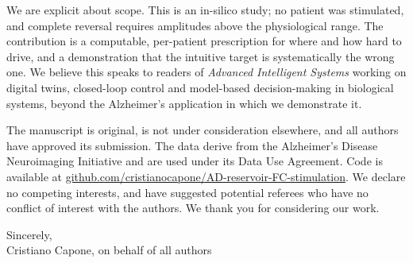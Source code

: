 \documentclass[11pt]{article}
\begin{document}
We are explicit about scope. This is an in-silico study; no patient was
stimulated, and complete reversal requires amplitudes above the physiological
range. The contribution is a computable, per-patient prescription for where and
how hard to drive, and a demonstration that the intuitive target is
systematically the wrong one. We believe this speaks to readers of
\textit{Advanced Intelligent Systems} working on digital twins, closed-loop
control and model-based decision-making in biological systems, beyond the
Alzheimer's application in which we demonstrate it.

The manuscript is original, is not under consideration elsewhere, and all authors
have approved its submission. The data derive from the Alzheimer's Disease
Neuroimaging Initiative and are used under its Data Use Agreement. Code is
available at
\href{https://github.com/cristianocapone/AD-reservoir-FC-stimulation}%
{github.com/cristianocapone/AD-reservoir-FC-stimulation}. We declare no
competing interests, and have suggested potential referees who have no conflict
of interest with the authors. We thank you for considering our work.

\vspace{1em}
{\raggedright
Sincerely,\\[0.3em]
Cristiano Capone, on behalf of all authors\par}
\end{document}
